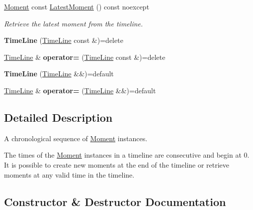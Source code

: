 \begin{DoxyCompactItemize}
\hyperlink{classtimeplane_1_1_moment}{Moment} const \hyperlink{classtimeplane_1_1_time_line_acc391553e5c45a647c82f27e53ae3af8}{Latest\+Moment} () const noexcept
\begin{DoxyCompactList}\small\item\em Retrieve the latest moment from the timeline. \end{DoxyCompactList}\item 
\mbox{\label{classtimeplane_1_1_time_line_abba50bd707ce998356abd59bbf302f94}} 
{\bfseries Time\+Line} (\hyperlink{classtimeplane_1_1_time_line}{Time\+Line} const \&)=delete
\item 
\mbox{\label{classtimeplane_1_1_time_line_ad8eb0c4a4c85e5d859fab5e1d70a757f}} 
\hyperlink{classtimeplane_1_1_time_line}{Time\+Line} \& {\bfseries operator=} (\hyperlink{classtimeplane_1_1_time_line}{Time\+Line} const \&)=delete
\item 
\mbox{\label{classtimeplane_1_1_time_line_a345833bfe7d67e2ca39067e92cb4929a}} 
{\bfseries Time\+Line} (\hyperlink{classtimeplane_1_1_time_line}{Time\+Line} \&\&)=default
\item 
\mbox{\label{classtimeplane_1_1_time_line_a6914130bc8b7bed844517bd0daed7b6b}} 
\hyperlink{classtimeplane_1_1_time_line}{Time\+Line} \& {\bfseries operator=} (\hyperlink{classtimeplane_1_1_time_line}{Time\+Line} \&\&)=default
\end{DoxyCompactItemize}


\subsection{Detailed Description}
A chronological sequence of {\ttfamily \hyperlink{classtimeplane_1_1_moment}{Moment}} instances. 

The times of the {\ttfamily \hyperlink{classtimeplane_1_1_moment}{Moment}} instances in a timeline are consecutive and begin at 0. It is possible to create new moments at the end of the timeline or retrieve moments at any valid time in the timeline. 

\subsection{Constructor \& Destructor Documentation}
\mbox{\label{classtimeplane_1_1_time_line_afacd08f817ddae17b1dea9c1989f74ae}} 
